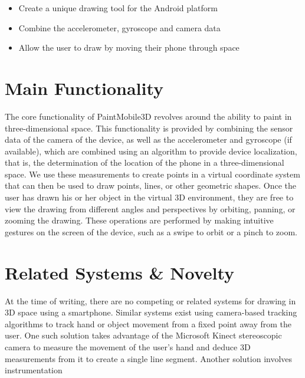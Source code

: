 \documentclass{chi-ext}
\begin{document}
\begin{itemize} \item Create a unique drawing tool for the Android platform
\item Combine the accelerometer, gyroscope and camera data \item Allow the
user to draw by moving their phone through space \end{itemize}

\section{Main Functionality}

The core functionality of PaintMobile3D revolves around the ability to paint
in three-dimensional space. This functionality is provided by combining the
sensor data of the camera of the device, as well as the accelerometer and
gyroscope (if available), which are combined using an algorithm to provide
device localization, that is, the determination of the location of the phone
in a three-dimensional space. We use these measurements to create points in a
virtual coordinate system that can then be used to draw points, lines, or
other geometric shapes. Once the user has drawn his or her object in the
virtual 3D environment, they are free to view the drawing from different
angles and perspectives by orbiting, panning, or zooming the drawing. These
operations are performed by making intuitive gestures on the screen of the
device, such as a swipe to orbit or a pinch to zoom.

\section{Related Systems \& Novelty}

At the time of writing, there are no competing or related systems for drawing
in 3D space using a smartphone. Similar systems exist using camera-based
tracking algorithms to track hand or object movement from a fixed point away
from the user. One such solution takes advantage of the Microsoft Kinect
stereoscopic camera to measure the movement of the user’s hand and deduce 3D
measurements from it to create a single line segment. Another solution
involves instrumentation 
\end{document}
